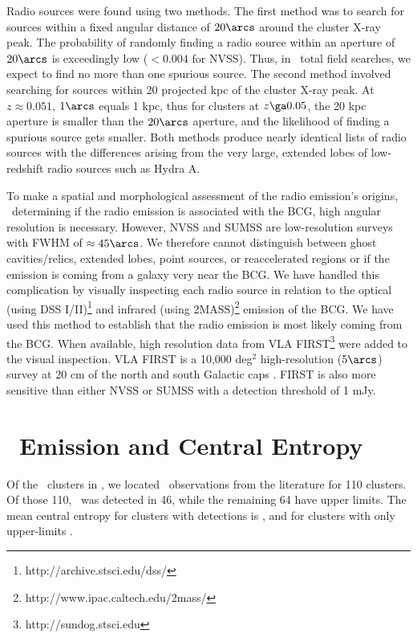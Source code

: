 Radio sources were found using two methods. The first method was to
search for sources within a fixed angular distance of $20\arcs$
around the cluster X-ray peak. The probability of randomly finding a
radio source within an aperture of $20\arcs$ is exceedingly low ($<
0.004$ for NVSS). Thus, in \entsuppnum\ total field searches, we expect to
find no more than one spurious source. The second method involved
searching for sources within 20 projected kpc of the cluster X-ray
peak. At $z \approx 0.051$, $1\arcs$ equals 1 kpc, thus for clusters
at $z \ga 0.05$, the 20 kpc aperture is smaller than the $20\arcs$
aperture, and the likelihood of finding a spurious source gets
smaller. Both methods produce nearly identical lists of radio sources
with the differences arising from the very large, extended lobes of
low-redshift radio sources such as Hydra A.

To make a spatial and morphological assessment of the radio emission's
origins, \ie\ determining if the radio emission is associated with the
BCG, high angular resolution is necessary. However, NVSS and SUMSS are
low-resolution surveys with FWHM of $\approx 45\arcs$. We therefore
cannot distinguish between ghost cavities/relics, extended lobes,
point sources, or reaccelerated regions or if the emission is coming
from a galaxy very near the BCG. We have handled this complication by
visually inspecting each radio source in relation to the optical
(using DSS I/II)\footnote{http://archive.stsci.edu/dss/} and infrared
(using 2MASS)\footnote{http://www.ipac.caltech.edu/2mass/} emission of
the BCG. We have used this method to establish that the radio emission
is most likely coming from the BCG. When available, high resolution
data from VLA FIRST\footnote{http://sundog.stsci.edu} were added to
the visual inspection. VLA FIRST is a 10,000 deg$^2$ high-resolution
($5\arcs$) survey at 20 cm of the north and south Galactic caps
\citep{first}. FIRST is also more sensitive than either NVSS or SUMSS
with a detection threshold of 1 mJy.

\section{\halpha\ Emission and Central Entropy}
\label{sec:haradsf}

Of the \entsuppnum\ clusters in \accept, we located
\halpha\ observations from the literature for 110 clusters. Of those
110, \halpha\ was detected in 46, while the remaining 64 have upper
limits. The mean central entropy for clusters with detections is \fha,
and for clusters with only upper-limits \nfha.

